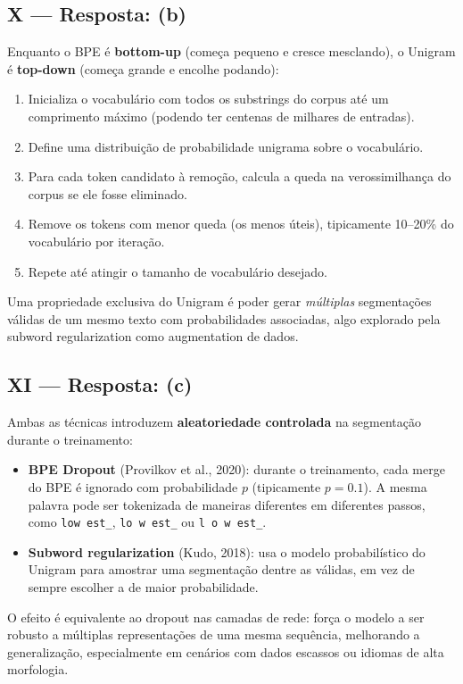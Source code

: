 \documentclass{dlproblemset}
\begin{document}
\subsection*{X — Resposta: (b)}
Enquanto o BPE é \textbf{bottom-up} (começa pequeno e cresce mesclando), o Unigram
é \textbf{top-down} (começa grande e encolhe podando):
\begin{enumerate}
  \item Inicializa o vocabulário com todos os substrings do corpus até um comprimento
        máximo (podendo ter centenas de milhares de entradas).
  \item Define uma distribuição de probabilidade unigrama sobre o vocabulário.
  \item Para cada token candidato à remoção, calcula a queda na verossimilhança do
        corpus se ele fosse eliminado.
  \item Remove os tokens com menor queda (os menos úteis), tipicamente 10–20\% do
        vocabulário por iteração.
  \item Repete até atingir o tamanho de vocabulário desejado.
\end{enumerate}
Uma propriedade exclusiva do Unigram é poder gerar \emph{múltiplas} segmentações
válidas de um mesmo texto com probabilidades associadas, algo explorado pela
subword regularization como augmentation de dados.

\subsection*{XI — Resposta: (c)}
Ambas as técnicas introduzem \textbf{aleatoriedade controlada} na segmentação durante
o treinamento:
\begin{itemize}
  \item \textbf{BPE Dropout} (Provilkov et al., 2020): durante o treinamento, cada
        merge do BPE é ignorado com probabilidade $p$ (tipicamente $p = 0.1$).
        A mesma palavra pode ser tokenizada de maneiras diferentes em diferentes passos,
        como \texttt{low~est\_}, \texttt{lo~w~est\_} ou \texttt{l~o~w~est\_}.
  \item \textbf{Subword regularization} (Kudo, 2018): usa o modelo probabilístico do
        Unigram para amostrar uma segmentação dentre as válidas, em vez de sempre
        escolher a de maior probabilidade.
\end{itemize}
O efeito é equivalente ao dropout nas camadas de rede: força o modelo a ser robusto
a múltiplas representações de uma mesma sequência, melhorando a generalização,
especialmente em cenários com dados escassos ou idiomas de alta morfologia.
\end{document}

